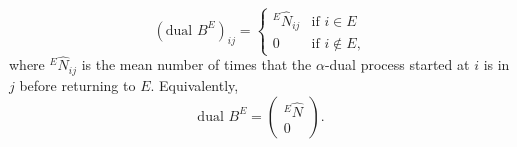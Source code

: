 $$(\text{dual } B^E)_{ij} = \begin{cases} {}^E \hat{N}_{ij} & \text{if } i \in E \\ 0 & \text{if } i \notin E, \end{cases}$$
where ${}^E \hat{N}_{ij}$ is the mean number of times that the $\alpha$-dual process started at $i$ is in $j$ before returning to $E$.
Equivalently,
$$\text{dual } B^E = \begin{pmatrix} {}^E \hat{N} \\ 0 \end{pmatrix}.$$
